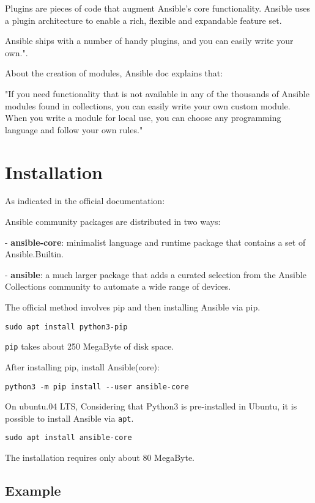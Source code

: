\documentclass[12pt,a4paper,openright,twoside]{book}
\begin{document}
Plugins are pieces of code that augment Ansible’s core functionality. Ansible uses a plugin architecture to enable a rich, flexible and expandable feature set.


Ansible ships with a number of handy plugins, and you can easily write your own."\cite{ansibleDocPlugins}.


About the creation of modules, Ansible doc explains that:


"If you need functionality that is not available in any of the thousands of Ansible modules found in collections, you can easily write your own custom module. When you write a module for local use, you can choose any programming language and follow your own rules."\cite{ansibleDocNewModules}

\section{Installation}
As indicated in the official documentation\cite{ansibleDocInstall}:

Ansible community packages are distributed in two ways:

- \textbf{ansible-core}: minimalist language and runtime package that contains a set of Ansible.Builtin.

- \textbf{ansible}: a much larger package that adds a curated selection from the Ansible Collections community to automate a wide range of devices.

The official method involves pip and then installing Ansible via pip.
\begin{lstlisting}
sudo apt install python3-pip
\end{lstlisting}

\texttt{pip} takes about 250 MegaByte of disk space.

After installing pip, install Ansible(core):

\begin{lstlisting}
python3 -m pip install --user ansible-core
\end{lstlisting}

On ubuntu.04 LTS,
Considering that Python3 is pre-installed in Ubuntu, it is possible to install Ansible via \texttt{apt}.

\begin{lstlisting}
sudo apt install ansible-core
\end{lstlisting}

The installation requires only about 80 MegaByte.

\subsection{Example}
\end{document}
